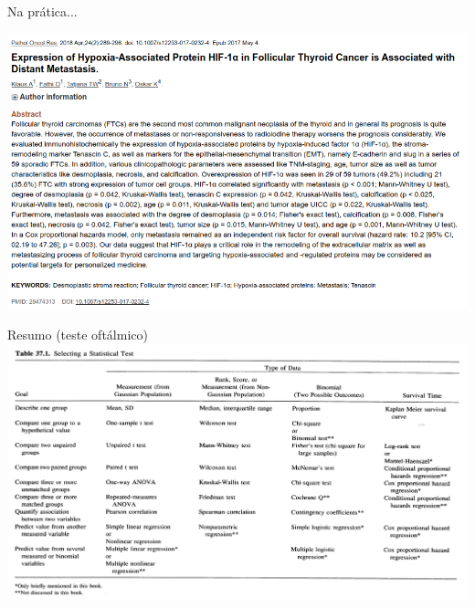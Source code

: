 \documentclass{beamer}
\begin{document}
\begin{frame}{\scriptsize Na prática...}
  \begin{center}
    \includegraphics[width=\textwidth]{Cap37-38/exemplo-varios}
  \end{center}
\end{frame}

\begin{frame}{\scriptsize Resumo (teste oftálmico)}
  \includegraphics[width=1.2\textwidth]{Cap37-38/metodos1}
\end{frame}
\end{document}
